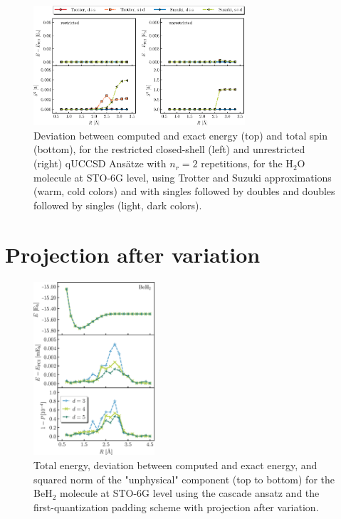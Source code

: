 \documentclass[aps,pra,twocolumn]{revtex4-2}
\begin{document}
\begin{figure}[t!]
\includegraphics[width=0.7\textwidth]{../figures/qUCCSD_flavors/quccsd_reps_2.eps}
\caption{Deviation between computed and exact energy (top) and total spin (bottom), for the restricted closed-shell (left) and unrestricted (right) qUCCSD Ans\"{a}tze with $n_r=2$ repetitions, for the H$_2$O molecule at STO-6G level, using Trotter and Suzuki approximations (warm, cold colors) and with singles followed by doubles and doubles followed by singles (light, dark colors).}
\label{figure:quccsd_reps_2}
\end{figure} 

\section{Projection after variation}
\label{sec:pav}

\begin{figure}[t!]
\includegraphics[width=0.4\textwidth]{../figures/first_quantization_pad_pav/first_quantization_pad_pav.eps}
\caption{Total energy, deviation between computed and exact energy, and squared norm of the "unphysical" component (top to bottom) for the BeH$_2$ molecule
at STO-6G level using the cascade ansatz and the first-quantization padding scheme with projection after variation.}
\label{figure:pad_pav}
\end{figure} 



\end{document}
